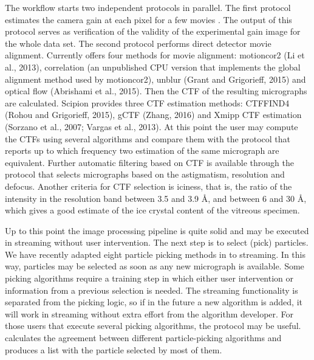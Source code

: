 The workflow starts two independent protocols in parallel. The first protocol estimates the camera gain at each pixel for a few  movies \citep{sorzano2018}. %
The output of this protocol serves as verification of the validity of the experimental gain image for the whole data set. The second protocol performs direct detector movie alignment. Currently \scipion offers  four  methods for movie alignment: motioncor2 (Li et al., 2013), correlation (an unpublished CPU version that implements the global alignment method used by motioncor2), unblur (Grant and Grigorieff, 2015) and optical flow (Abrishami et al., 2015). Then the CTF of the resulting micrographs are calculated. Scipion provides three CTF estimation methods:
CTFFIND4 (Rohou and Grigorieff, 2015), gCTF (Zhang, 2016) and Xmipp CTF estimation (Sorzano et al., 2007; Vargas et al., 2013). At this point the user may compute the CTFs using several algorithms and compare them with the protocol  that reports up to which frequency two estimation of the same micrograph are equivalent. Further automatic filtering based on CTF is available through the protocol  that selects micrographs based on the astigmatism, resolution and defocus. Another criteria for CTF selection is iciness, that is,  the ratio of the intensity in the resolution band between 3.5 and 3.9 \AA, and between 6 and 30 \AA, which gives a good estimate of the ice crystal content of the vitreous specimen.

Up to this point the image processing pipeline is quite solid and may be executed in streaming without user intervention. The next step is to select (pick) particles. We have recently adapted eight particle picking methods in \scipion  to streaming. In this way,  particles may be selected as soon as any new micrograph is available. Some picking algorithms require a training step in which either user intervention or information from a previous selection is needed. The streaming functionality is separated from the picking logic, so if in the future a new algorithm is added, it will work in streaming without extra effort from the algorithm developer. For those users that execute several picking algorithms, the protocol  may be useful.   calculates the agreement between different particle-picking algorithms and produces a list with the particle selected by most of them.

